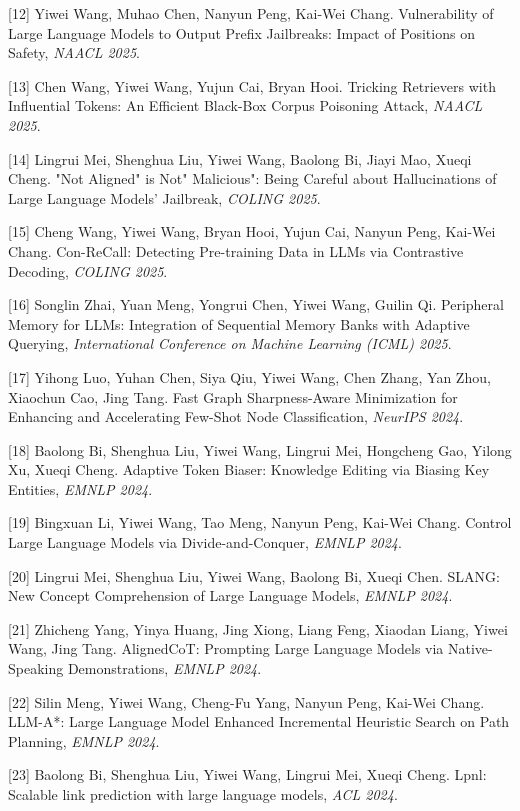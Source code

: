 [12] Yiwei Wang, Muhao Chen, Nanyun Peng, Kai-Wei Chang. Vulnerability of Large Language Models to Output Prefix Jailbreaks: Impact of Positions on Safety, \textit{NAACL 2025}.

[13] Chen Wang, Yiwei Wang, Yujun Cai, Bryan Hooi. Tricking Retrievers with Influential Tokens: An Efficient Black-Box Corpus Poisoning Attack, \textit{NAACL 2025}.

[14] Lingrui Mei, Shenghua Liu, Yiwei Wang, Baolong Bi, Jiayi Mao, Xueqi Cheng. "Not Aligned" is Not" Malicious": Being Careful about Hallucinations of Large Language Models' Jailbreak, \textit{COLING 2025}.

[15] Cheng Wang, Yiwei Wang, Bryan Hooi, Yujun Cai, Nanyun Peng, Kai-Wei Chang. Con-ReCall: Detecting Pre-training Data in LLMs via Contrastive Decoding, \textit{COLING 2025}.

[16] Songlin Zhai, Yuan Meng, Yongrui Chen, Yiwei Wang, Guilin Qi. Peripheral Memory for LLMs: Integration of Sequential Memory Banks with Adaptive Querying, \textit{International Conference on Machine Learning (ICML) 2025}.

[17] Yihong Luo, Yuhan Chen, Siya Qiu, Yiwei Wang, Chen Zhang, Yan Zhou, Xiaochun Cao, Jing Tang. Fast Graph Sharpness-Aware Minimization for Enhancing and Accelerating Few-Shot Node Classification, \textit{NeurIPS 2024}.

[18] Baolong Bi, Shenghua Liu, Yiwei Wang, Lingrui Mei, Hongcheng Gao, Yilong Xu, Xueqi Cheng. Adaptive Token Biaser: Knowledge Editing via Biasing Key Entities, \textit{EMNLP 2024}.

[19] Bingxuan Li, Yiwei Wang, Tao Meng, Nanyun Peng, Kai-Wei Chang. Control Large Language Models via Divide-and-Conquer, \textit{EMNLP 2024}.

[20] Lingrui Mei, Shenghua Liu, Yiwei Wang, Baolong Bi, Xueqi Chen. SLANG: New Concept Comprehension of Large Language Models, \textit{EMNLP 2024}.

[21] Zhicheng Yang, Yinya Huang, Jing Xiong, Liang Feng, Xiaodan Liang, Yiwei Wang, Jing Tang. AlignedCoT: Prompting Large Language Models via Native-Speaking Demonstrations, \textit{EMNLP 2024}.

[22] Silin Meng, Yiwei Wang, Cheng-Fu Yang, Nanyun Peng, Kai-Wei Chang. LLM-A*: Large Language Model Enhanced Incremental Heuristic Search on Path Planning, \textit{EMNLP 2024}.

[23] Baolong Bi, Shenghua Liu, Yiwei Wang, Lingrui Mei, Xueqi Cheng. Lpnl: Scalable link prediction with large language models, \textit{ACL 2024}.

